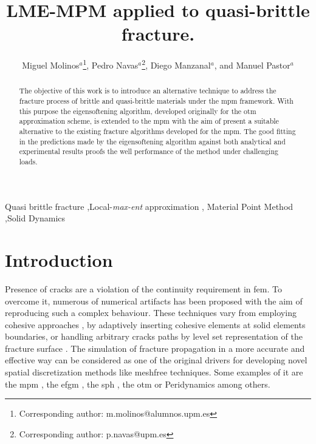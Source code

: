 \documentclass[preprint,12pt,a4paper]{elsarticle}
\begin{document}
\begin{frontmatter}

\title{LME-MPM applied to quasi-brittle fracture.}


\author{
Miguel Molinos$^a$\footnote{Corresponding author: m.molinos@alumnos.upm.es},
Pedro Navas$^a$\footnote{Corresponding author: p.navas@upm.es},
Diego Manzanal$^a$,
and Manuel Pastor$^a$
 }
 \address{
 $^a$ ETSI Caminos, Canales y Puertos, Universidad Polit\'ectnica de Madrid.\\
 c. Prof. Aranguren 3, 28040 Madrid, Spain
}

\begin{abstract}
  The objective of this work is to introduce an alternative
  technique to address the fracture process of brittle and
  quasi-brittle materials under the \acrfull{mpm} 
  framework. With this purpose the eigensoftening algorithm, developed
  originally for the \acrfull{otm} approximation scheme, is extended
  to the \acrshort{mpm} with the aim of present a suitable alternative
  to the existing fracture algorithms developed for the
  \acrshort{mpm}. The good fitting in the predictions made by the
  eigensoftening algorithm against both analytical and experimental
  results proofs the well performance of the method under challenging
  loads.
\end{abstract}

\begin{keyword}
Quasi brittle fracture \sep Local-\textit{max-ent} approximation \sep
Material Point Method \sep Solid Dynamics
\end{keyword}

\end{frontmatter}

\linenumbers

\section{Introduction}
\label{sec:1}
Presence of cracks are a violation of the continuity requirement in
\acrfull{fem}. To overcome it, numerous of numerical
artifacts has been proposed with the aim of reproducing such a
complex behaviour. These techniques vary from employing cohesive
approaches \cite{Barenblatt,Hilleborg_1976}, by adaptively inserting
cohesive elements \cite{Ortiz_1999,Pandolfi_2002,Ruiz_2000} at solid
elements boundaries, or handling arbitrary cracks paths by level set
representation of the fracture surface \cite{Belytschko_03}. The
simulation of fracture propagation in a more accurate and effective
way can be considered as one of the original drivers for developing
novel spatial discretization methods like meshfree techniques. Some
examples of it are the \acrfull{mpm}
\cite{Schreyer_2002,Chen_2002,Nairn_2003,Zhenmao_2005}, the
\acrfull{efgm} \cite{BELYTSCHKO_1995,BELYTSCHKO_2000,Zhuang_2012,Muthu_2013}, the
\acrfull{sph} \cite{Wang_2020,Wang_2019}, the \acrfull{otm} \cite{Li2010,Li_2012,Pandolfi_2013,Li_2015} or Peridynamics
\cite{HA_2011,RABCZUK_2017} among others. \\
\end{document}
